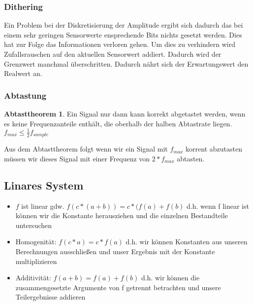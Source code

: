 \documentclass{article} %
\theoremstyle{definition}
\newtheorem*{Abtasttheorem}{Abtasttheorem}
\begin{document}
		\subsubsection{Dithering}
		Ein Problem bei der Diskretisierung der Amplitude ergibt sich dadurch das bei einem sehr geringen Sensorwerte ensprechende Bits nichts gesetzt werden. Dies hat zur Folge das Informationen verloren gehen. Um dies zu verhindern wird Zufallsrauschen auf den aktuellen Sensorwert addiert. Dadurch wird der Grenzwert manchmal überschritten. Dadurch nährt sich der Erwartungswert den Realwert an. 
		\subsubsection{Abtastung}
		\begin{Abtasttheorem}
			Ein Signal nur dann kann korrekt abgetastet werden, wenn es keine
			Frequenzanteile enthält, die oberhalb der halben Abtastrate liegen.\\
			$f_{max} \leq \frac{1}{2}f_{sample}$
		\end{Abtasttheorem}
		Aus dem Abtasttheorem folgt wenn wir ein Signal mit $f_{max}$ korrent abzutasten müssen wir dieses Signal mit einer Frequenz von $2*f_{max}$ abtasten. 
	\subsection{Linares System}
	\begin{itemize}
		\item $f$ ist linear gdw. $f(c*(a+b)) = c*(f(a) + f(b)$ d.h. wenn f linear ist können wir die Konstante herausziehen und die einzelnen Bestandteile untersuchen
		\item Homogenität: $f(c*a) = c*f(a)$ d.h. wir können Konstanten aus unseren Berechnungen ausschließen und unser Ergebnis mit der Konstante multiplizieren
		\item Additivität: $f(a+b) = f(a)+f(b)$ d.h. wir können die zusammengesetzte Argumente von f getrennt betrachten und unsere Teilergebnisse addieren
	\end{itemize}





\end{document}
